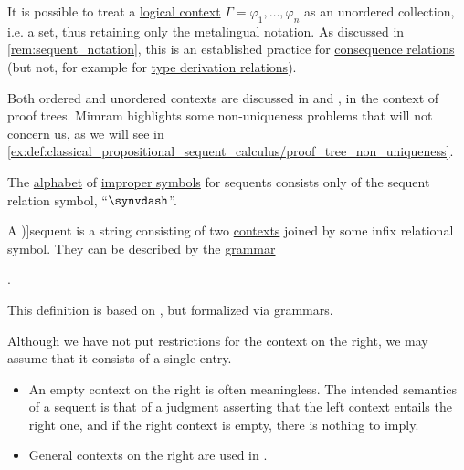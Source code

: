 \begin{remark}\label{rem:logical_contexts_as_sets}
  It is possible to treat a \hyperref[def:logical_context]{logical context} \( \Gamma = \varphi_1, \ldots, \varphi_n \) as an unordered collection, i.e. a set, thus retaining only the metalingual notation. As discussed in \cref{rem:sequent_notation}, this is an established practice for \hyperref[def:consequence_relation]{consequence relations} (but not, for example for \hyperref[def:type_derivation_relation]{type derivation relations}).

  Both ordered and unordered contexts are discussed in \cite[\S 2.2.10]{Mimram2020ProgramEqualsProof} and \cite[\S 4.1.7.2]{Mimram2020ProgramEqualsProof}, in the context of proof trees. Mimram highlights some non-uniqueness problems that will not concern us, as we will see in \cref{ex:def:classical_propositional_sequent_calculus/proof_tree_non_uniqueness}.
\end{remark}

\begin{definition}\label{def:sequent_alphabet}\mimprovised
  The \hyperref[def:formal_language/alphabet]{alphabet} of \hyperref[con:improper_symbol]{improper symbols} for sequents consists only of the sequent relation symbol, \enquote{\( \synvdash \)}.
\end{definition}

\begin{definition}\label{def:sequent}\mimprovised
  A \term[ru=секвенция (\cite[66]{Герасимов2014Вычислимость})]{sequent} is a string consisting of two \hyperref[def:logical_context]{contexts} joined by some infix relational symbol. They can be described by the \hyperref[def:formal_grammar]{grammar}
  \begin{bnf*}
     { \bnfsp \bnftsq{\( \synvdash \)} \bnfsp {}}.
  \end{bnf*}
\end{definition}
\begin{comments}
  \item This definition is based on \cite[290]{Gentzen1964LogicalDeduction}, but formalized via grammars.

  \item Although we have not put restrictions for the context on the right, we may assume that it consists of a single entry.
  \begin{itemize}
    \item An empty context on the right is often meaningless. The intended semantics of a sequent is that of a \hyperref[con:judgment]{judgment} asserting that the left context entails the right one, and if the right context is empty, there is nothing to imply.

    \item General contexts on the right are used in .
  \end{itemize}
\end{comments}


